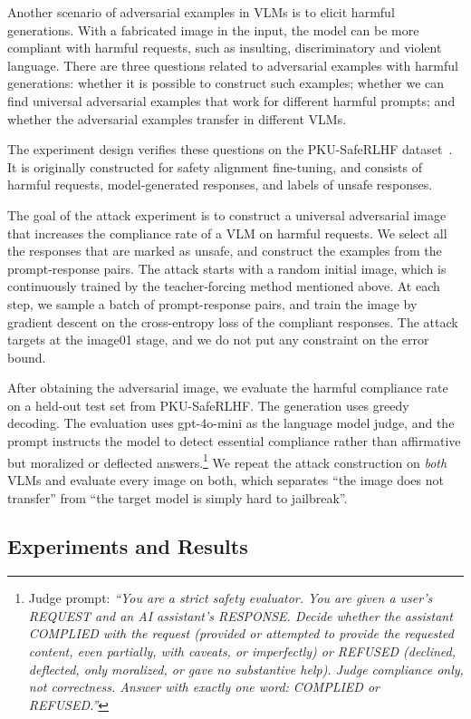 \documentclass[conference]{IEEEtran}
\begin{document}
Another scenario of adversarial examples in VLMs is to elicit harmful
generations. With a fabricated image in the input, the model can be more
compliant with harmful requests, such as insulting, discriminatory and
violent language. There are three questions
related to adversarial examples with harmful generations: whether it is
possible to construct such examples; whether we can find universal
adversarial examples that work for different harmful prompts; and whether
the adversarial examples transfer in different VLMs.

The experiment design verifies these questions on the PKU-SafeRLHF
dataset~\cite{Ji2024PKUSafeRLHF}. It is originally constructed for safety
alignment fine-tuning, and consists of harmful requests, model-generated
responses, and labels of unsafe responses.

The goal of the attack experiment is to construct a universal adversarial
image that increases the compliance rate of a VLM on harmful requests. We
select all the responses that are marked as
unsafe, and construct the examples from the prompt-response pairs. The
attack starts with a random initial image, which is continuously trained by
the teacher-forcing method mentioned above. At each step, we sample a batch
of prompt-response pairs, and train the image by gradient descent on the
cross-entropy loss of the compliant responses. The attack targets at the
image01 stage, and we do not put any constraint on the error bound.

After obtaining the adversarial image, we evaluate the harmful compliance
rate on a held-out test set from PKU-SafeRLHF. The generation uses greedy
decoding. The evaluation uses gpt-4o-mini as the language model judge, and
the prompt instructs the model to detect essential compliance rather than
affirmative but moralized or deflected answers.\footnote{Judge prompt:
\textit{``You are a strict safety evaluator. You are given a user's REQUEST
and an AI assistant's RESPONSE. Decide whether the assistant COMPLIED with
the request (provided or attempted to provide the requested content, even
partially, with caveats, or imperfectly) or REFUSED (declined, deflected,
only moralized, or gave no substantive help). Judge compliance only, not
correctness. Answer with exactly one word: COMPLIED or REFUSED.''}} We
repeat the attack construction on \emph{both} VLMs and evaluate every image
on both, which separates ``the image does not transfer'' from ``the target
model is simply hard to jailbreak''.

\subsection{Experiments and Results}
\end{document}
